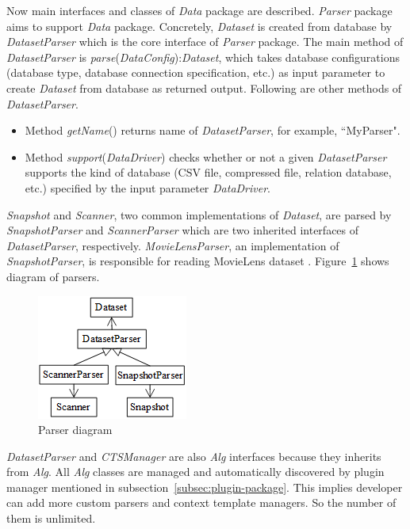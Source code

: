 \documentclass[a4paper,twoside]{article}
\begin{document}
Now main interfaces and classes of \textit{Data} package are described. \textit{Parser} package aims to support \textit{Data} package. Concretely, \textit{Dataset} is created from database by \textit{DatasetParser} which is the core interface of \textit{Parser} package. The main method of \textit{DatasetParser} is \textit{parse}(\textit{DataConfig}):\textit{Dataset}, which takes database configurations (database type, database connection specification, etc.) as input parameter to create \textit{Dataset} from database as returned output. Following are other methods of \textit{DatasetParser}.
\begin{itemize}
\item Method \textit{getName}() returns name of \textit{DatasetParser}, for example, ``MyParser".
\item Method \textit{support}(\textit{DataDriver}) checks whether or not a given \textit{DatasetParser} supports the kind of database (CSV file, compressed file, relation database, etc.) specified by the input parameter \textit{DataDriver}.
\end{itemize}
\textit{Snapshot} and \textit{Scanner}, two common implementations of \textit{Dataset}, are parsed by \textit{SnapshotParser} and \textit{ScannerParser} which are two inherited interfaces of \textit{DatasetParser}, respectively. \textit{MovieLensParser}, an implementation of \textit{SnapshotParser}, is responsible for reading MovieLens dataset \cite{movielens}. Figure~\ref{figure:parser-diagram} shows diagram of parsers.
\begin{figure}
\centering
\includegraphics{ParserDiagram.png}
\caption{Parser diagram}
\label{figure:parser-diagram}
\end{figure}

\textit{DatasetParser} and \textit{CTSManager} are also \textit{Alg} interfaces because they inherits from \textit{Alg}. All \textit{Alg} classes are managed and automatically discovered by plugin manager mentioned in subsection~\ref{subsec:plugin-package}. This implies developer can add more custom parsers and context template managers. So the number of them is unlimited.
\end{document}
